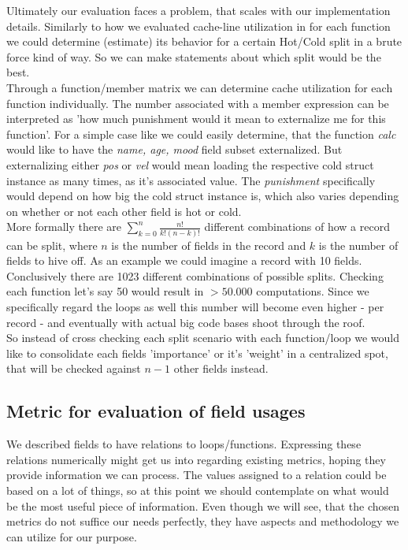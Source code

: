 Ultimately our evaluation faces a problem, that scales with our implementation details. Similarly to how we evaluated cache-line utilization in  for each function we could determine (estimate) its behavior for a certain Hot/Cold split in a brute force kind of way. So we can make statements about which split would be the best.\\
Through a function/member matrix we can determine cache utilization for each function individually. The number associated with a member expression can be interpreted as 'how much punishment would it mean to externalize me for this function'. For a simple case like  we could easily determine, that the function \textit{calc} would like to have the \textit{name, age, mood} field subset externalized. But externalizing either \textit{pos} or \textit{vel} would mean loading the respective cold struct instance as many times, as it's associated value. The \textit{punishment} specifically would depend on how big the cold struct instance is, which also varies depending on whether or not each other field is hot or cold.\\
More formally there are $\sum_{k=0}^{n} \frac{n!}{k!(n-k)!}$ different combinations of how a record can be split, where $n$ is the number of fields in the record and $k$ is the number of fields to hive off. As an example we could imagine a record with 10 fields. Conclusively there are 1023 different combinations of possible splits. Checking each function let's say 50 would result in $> 50.000$ computations. Since we specifically regard the loops as well this number will become even higher - per record - and eventually with actual big code bases shoot through the roof.\\
So instead of cross checking each split scenario with each function/loop we would like to consolidate each fields 'importance' or it's 'weight' in a centralized spot, that will be checked against $n-1$ other fields instead.

\subsection{Metric for evaluation of field usages}\label{metrics}
We described fields to have relations to loops/functions. Expressing these relations numerically might get us into regarding existing metrics, hoping they provide information we can process. The values assigned to a relation could be based on a lot of things, so at this point we should contemplate on what would be the most useful piece of information. Even though we will see, that the chosen metrics do not suffice our needs perfectly, they have aspects and methodology we can utilize for our purpose.
